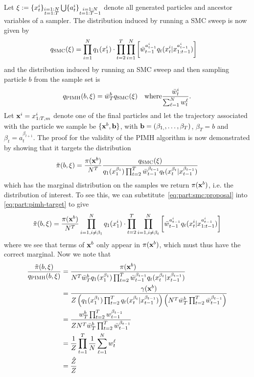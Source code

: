 Let $\mathbf{\xi} := \{x_{t}^i\}_{\substack{i=1:N\\t=1:T}} \bigcup \{a_{t}^i\}_{\substack{i=1:N\\t=1:T-1}}$
denote all generated particles and ancestor variables of a \smc sampler.  The distribution induced
by running a SMC sweep is now given by
\begin{align}
\label{eq:part:smc:proposal}
q_{\text{SMC}}(\mathbf{\xi}) &= \prod_{i=1}^N q_1(x_{1}^i) \cdot \prod_{t=2}^T \prod_{i=1}^N \left[ 
\bar w_{t-1}^{a_{t-1}^i}
q_t(x_{t}^i|x_{1:t-1}^{a_{t-1}^i}) \right]
\end{align}
and the distribution induced by running an SMC sweep and then sampling particle $b$ from the
sample set is 
\begin{align}
q_{\text{PIMH}}(b,\mathbf{\xi}) = \bar{w}_T^b q_{\text{SMC}}(\mathbf{\xi}) \quad \mathrm{where} \frac{\bar{w}_t^i}{\sum_{\ell=1}^{N}w_t^{\ell}} .
\end{align}
Let $\mathbf{x}^i = x_{1:T,m}^i$ denote one of the final particles and let the trajectory associated
with the particle we sample be $\{\mathbf{x}^{b},\mathbf{b}\}$, with $\mathbf{b} = (\beta_{1,},\ldots,\beta_{T})$,
$\beta_{T} = b$ and $\beta_{t} = a_{t}^{\beta_{t+1}}$. The proof for the validity of the PIMH
algorithm is now demonstrated by showing that it targets the distribution
\begin{align}
\label{eq:part:pimh-target}
\tilde{\pi}(b,\xi) = \frac{\pi(\mathbf{x}^{b})}{N^T} \frac{q_{\text{SMC}}(\mathbf{\xi})}{q_1(x_1^{\beta_1}) \prod_{t=2}^{T} \bar{w}_{t-1}^{\beta_{t-1}}
	 q_t(x_t^{\beta_t} | x_{t-1}^{\beta_{t-1}})}
\end{align}
which has the marginal distribution on the samples we return $\pi(\mathbf{x}^{b})$, i.e. the
distribution of interest.  To see this, we can substitute~\eqref{eq:part:smc:proposal} into
\eqref{eq:part:pimh-target} to give
\begin{align}
\tilde{\pi}(b,\xi) = \frac{\pi(\mathbf{x}^{b})}{N^T} \prod_{i=1, i\neq\beta_1}^N q_1(x_{1}^i) \cdot \prod_{t=2}^T \prod_{i=1, i\neq\beta_t}^N \left[ 
\bar w_{t-1}^{a_{t-1}^i}
q_t(x_{t}^i|x_{1:t-1}^{a_{t-1}^i}) \right]
\end{align}
where we see that terms of $\mathbf{x}^{b}$ only appear in $\pi(\mathbf{x}^{b})$, which must thus
have the correct marginal.  Now we note that
\begin{align}
\frac{\tilde{\pi}(b,\xi)}{q_{\text{PIMH}}(b,\mathbf{\xi})} &= \frac{\pi(\mathbf{x}^{b})}{N^T \bar{w}_T^b q_1(x_1^{\beta_1}) \prod_{t=2}^{T} \bar{w}_{t-1}^{\beta_{t-1}} q_t(x_t^{\beta_t} | x_{t-1}^{\beta_{t-1}})} \nonumber \\
&= \frac{\gamma(\mathbf{x}^{b})}{
	Z \left(q_1(x_1^{\beta_1}) \prod_{t=2}^{T} q_t(x_t^{\beta_t} | x_{t-1}^{\beta_{t-1}})\right)
	 \left(N^T \bar{w}_T^b\prod_{t=2}^{T} \bar{w}_{t-1}^{\beta_{t-1}}\right)} \nonumber \\
&= \frac{
	w_T^b \prod_{t=2}^{T} w_{t-1}^{\beta_{t-1}}
	}{
	Z N^T \bar{w}_T^b \prod_{t=2}^{T} \bar{w}_{t-1}^{\beta_{t-1}}} \nonumber \\
&= \frac{1}{Z} \prod_{t=1}^T \frac{1}{N} \sum_{\ell=1}^N w_{t}^{\ell} \nonumber \\
& = \frac{\hat{Z}}{Z}
\end{align}
